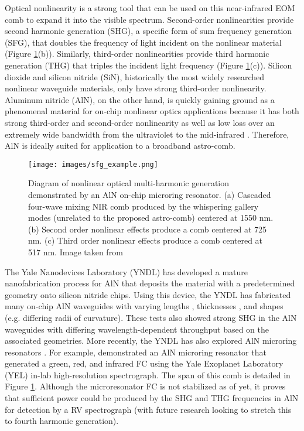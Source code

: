 Optical nonlinearity is a strong tool that can be used on this near-infrared EOM comb to expand it into the visible spectrum. Second-order nonlinearities provide second harmonic generation (SHG), a specific form of sum frequency generation (SFG), that doubles the frequency of light incident on the nonlinear material (Figure \ref{fig:sfg_example}(b)). Similarly, third-order nonlinearities provide third harmonic generation (THG) that triples the incident light frequency (Figure \ref{fig:sfg_example}(c)). Silicon dioxide and silicon nitride (SiN), historically the most widely researched nonlinear waveguide materials, only have strong third-order nonlinearity. Aluminum nitride (AlN), on the other hand, is quickly gaining ground as a phenomenal material for on-chip nonlinear optics applications because it has both strong third-order and second-order nonlinearity as well as low loss over an extremely wide bandwidth from the ultraviolet to the mid-infrared \citep{Jung2016}. Therefore, AlN is ideally suited for application to a broadband astro-comb.

\begin{figure}
    \centering
    \texttt{[image: images/sfg\_example.png]}
    \caption{Diagram of nonlinear optical multi-harmonic generation demonstrated by an AlN on-chip microring resonator. (a) Cascaded four-wave mixing NIR comb produced by the whispering gallery modes (unrelated to the proposed astro-comb) centered at 1550 nm. (b) Second order nonlinear effects produce a comb centered at 725 nm. (c) Third order nonlinear effects produce a comb centered at 517 nm. Image taken from \cite{Jung2014a}}
    \label{fig:sfg_example}
\end{figure}

The Yale Nanodevices Laboratory (YNDL) has developed a mature nanofabrication process for AlN that deposits the material with a predetermined geometry onto silicon nitride chips. Using this device, the YNDL has fabricated many on-chip AlN waveguides with varying lengths \citep[\SI{300}{\micro\meter} to \SI{3}{\centi\meter};][]{Xiong2012a}, thicknesses \citep[330--\SI{1500}{\nano\meter};][]{Pernice2012}, and shapes (e.g. differing radii of curvature). These tests also showed strong SHG in the AlN waveguides with differing wavelength-dependent throughput based on the associated geometries. More recently, the YNDL has also explored AlN microring resonators \citep{Jung2013, Guo2016}. For example, \citet{Jung2014a} demonstrated an AlN microring resonator that generated a green, red, and infrared FC using the Yale Exoplanet Laboratory (YEL) in-lab high-resolution spectrograph. The span of this comb is detailed in Figure \ref{fig:sfg_example}. Although the microresonator FC is not stabilized as of yet, it proves that sufficient power could be produced by the SHG and THG frequencies in AlN for detection by a RV spectrograph (with future research looking to stretch this to fourth harmonic generation).

